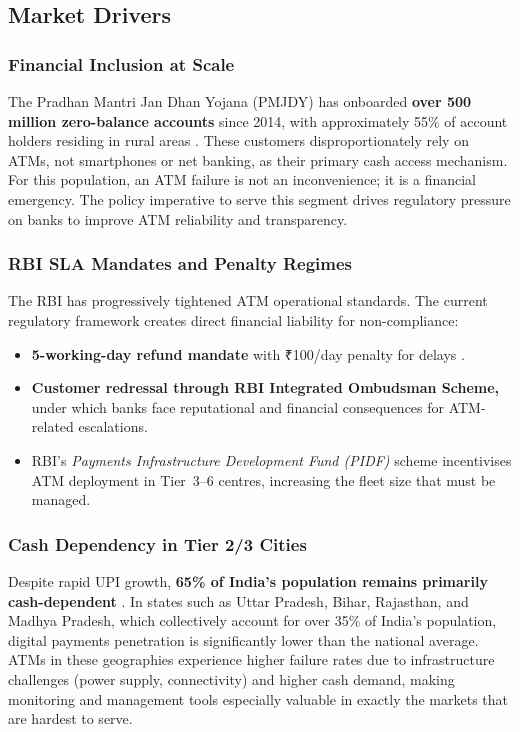 \documentclass[12pt,a4paper]{article}
\newcommand{\inr}{₹}
\begin{document}
\subsection{Market Drivers}

\subsubsection{Financial Inclusion at Scale}

The Pradhan Mantri Jan Dhan Yojana (PMJDY) has onboarded \textbf{over 500 million zero-balance
accounts} since 2014, with approximately 55\% of account holders residing in rural areas
\citep{pmjdy2024}. These customers disproportionately rely on ATMs, not smartphones or net
banking, as their primary cash access mechanism. For this population, an ATM failure is not an
inconvenience; it is a financial emergency. The policy imperative to serve this segment drives
regulatory pressure on banks to improve ATM reliability and transparency.

\subsubsection{RBI SLA Mandates and Penalty Regimes}

The RBI has progressively tightened ATM operational standards. The current regulatory framework
creates direct financial liability for non-compliance:
\begin{itemize}
  \item \textbf{5-working-day refund mandate} with \inr{}100/day penalty for delays
        \citep{rbi2011circular}.
  \item \textbf{Customer redressal through RBI Integrated Ombudsman Scheme,} under which banks
        face reputational and financial consequences for ATM-related escalations.
  \item RBI's \textit{Payments Infrastructure Development Fund (PIDF)} scheme incentivises
        ATM deployment in Tier~3--6 centres, increasing the fleet size that must be managed.
\end{itemize}

\subsubsection{Cash Dependency in Tier 2/3 Cities}

Despite rapid UPI growth, \textbf{65\% of India's population remains primarily cash-dependent}
\citep{rbi2023financial}. In states such as Uttar Pradesh, Bihar, Rajasthan, and Madhya Pradesh,
which collectively account for over 35\% of India's population, digital payments penetration is
significantly lower than the national average. ATMs in these geographies experience higher failure
rates due to infrastructure challenges (power supply, connectivity) and higher cash demand, making
monitoring and management tools especially valuable in exactly the markets that are hardest to serve.
\end{document}
